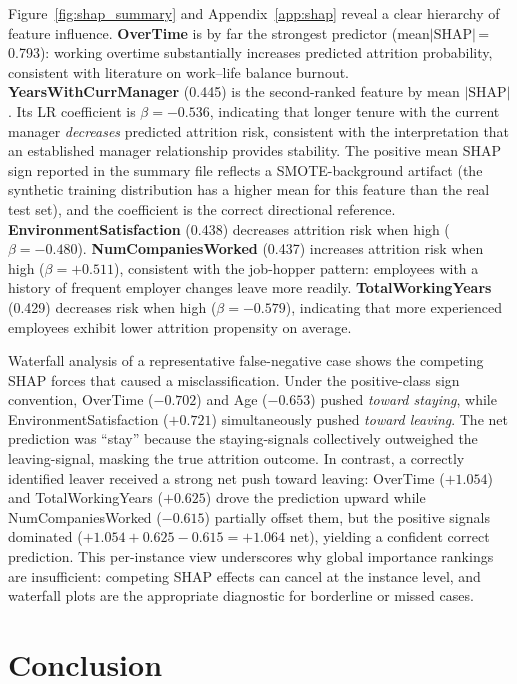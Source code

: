 \documentclass{article}
\begin{document}
Figure~\ref{fig:shap_summary} and Appendix~\ref{app:shap} reveal a
clear hierarchy of feature influence. \textbf{OverTime} is by far the
strongest predictor (mean$|\text{SHAP}|$\,=\,0.793): working overtime
substantially increases predicted attrition probability, consistent with
literature on work--life balance burnout. \textbf{YearsWithCurrManager}
(0.445) is the second-ranked feature by mean $|\text{SHAP}|$. Its LR
coefficient is $\beta = -0.536$, indicating that longer tenure with the
current manager \textit{decreases} predicted attrition risk, consistent
with the interpretation that an established manager relationship provides
stability. The positive mean SHAP sign reported in the summary file
reflects a SMOTE-background artifact (the synthetic training distribution
has a higher mean for this feature than the real test set), and the
coefficient is the correct directional reference. \textbf{EnvironmentSatisfaction}
(0.438) decreases attrition risk when high ($\beta = -0.480$). \textbf{NumCompaniesWorked}
(0.437) increases attrition risk when high ($\beta = +0.511$), consistent
with the job-hopper pattern: employees with a history of frequent employer
changes leave more readily. \textbf{TotalWorkingYears} (0.429) decreases
risk when high ($\beta = -0.579$), indicating that more experienced
employees exhibit lower attrition propensity on average.

Waterfall analysis of a representative false-negative case shows the
competing SHAP forces that caused a misclassification. Under the
positive-class sign convention, OverTime ($-0.702$) and Age ($-0.653$)
pushed \textit{toward staying}, while EnvironmentSatisfaction ($+0.721$)
simultaneously pushed \textit{toward leaving}. The net prediction was
``stay'' because the staying-signals collectively outweighed the leaving-signal,
masking the true attrition outcome. In contrast, a correctly identified
leaver received a strong net push toward leaving: OverTime ($+1.054$)
and TotalWorkingYears ($+0.625$) drove the prediction upward while
NumCompaniesWorked ($-0.615$) partially offset them, but the positive
signals dominated ($+1.054 + 0.625 - 0.615 = +1.064$ net), yielding a
confident correct prediction. This per-instance view underscores why
global importance rankings are insufficient: competing SHAP effects can
cancel at the instance level, and waterfall plots are the appropriate
diagnostic for borderline or missed cases.

\section{Conclusion}
\label{sec:conclusion}
\end{document}
